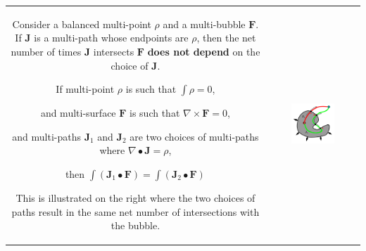 \begin{tabular}{cc}
\parbox{0.5\textwidth}{
Consider a balanced multi-point \(\rho\) and a multi-bubble \(\mathbf{F}\). If \(\mathbf{J}\) is a multi-path whose endpoints are \(\rho\), then the net number of times \(\mathbf{J}\) intersects \(\mathbf{F}\) {\bf does not depend} on the choice of \(\mathbf{J}\). 

\begin{thm}
If multi-point \(\rho\) is such that \(\int \rho = 0\), 

and multi-surface \(\mathbf{F}\) is such that \(\nabla \times \mathbf{F} = 0\), 

and multi-paths \(\mathbf{J}_1\) and \(\mathbf{J}_2\) are two choices  
of multi-paths where \(\nabla \bullet \mathbf{J} = \rho\), 

then \(\int (\mathbf{J}_1 \bullet \mathbf{F}) = \int (\mathbf{J}_2 \bullet \mathbf{F})\)
\end{thm}

This is illustrated on the right where the two choices of paths result in the same net number of intersections with the bubble.
} & \parbox{0.5\textwidth}{
\includegraphics[width = 0.5\textwidth]{Intersections/Path-surface_intersections/closed_surface_and_different_paths}
}
\end{tabular}



